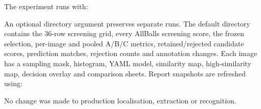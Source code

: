 The experiment runs with:
\begin{quote}
\end{quote}
An optional directory argument preserves separate runs. The default directory
contains the 36-row screening grid, every AllBalls screening score, the
frozen selection, per-image and pooled A/B/C metrics, retained/rejected
candidate scores, prediction matches, rejection counts and annotation
changes. Each image has a sampling mask, histogram, YAML model, similarity
map, high-similarity map, decision overlay and comparison sheets.
Report snapshots are refreshed using:
\begin{quote}
\end{quote}
No change was made to production localisation, extraction or recognition.
